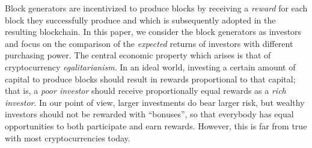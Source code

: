 Block generators are incentivized to produce blocks by receiving a
\emph{reward} for each block they successfully produce and which is
subsequently adopted in the resulting blockchain.
In this paper, we consider the block generators as investors and focus on the
comparison of the \emph{expected} returns of investors with different
purchasing power. The central economic property which arises is that of
cryptocurrency \emph{egalitarianism}. In an ideal world, investing a certain
amount of capital to produce blocks should result in rewards proportional to
that capital; that is, a \emph{poor investor} should receive proportionally
equal rewards as a \emph{rich investor}. In our point of view, larger
investments do bear larger risk, but wealthy investors should not be rewarded
with ``bonuses'', so that everybody has equal opportunities to both participate
and earn rewards. However, this is far from true with most cryptocurrencies
today.


